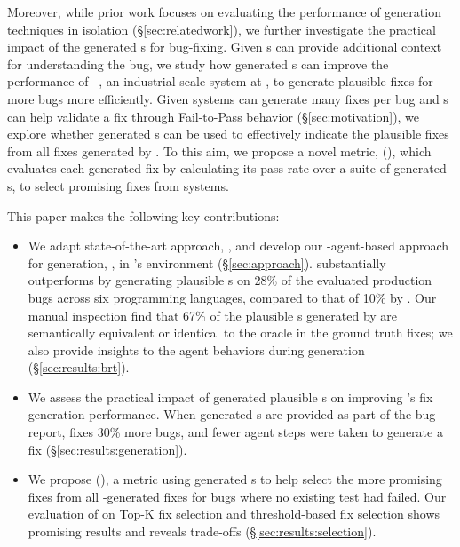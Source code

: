 Moreover, while prior work focuses on evaluating the performance of \brt generation techniques in isolation (\S\ref{sec:relatedwork}), we further investigate the practical impact of the generated \brt{}s for bug-fixing.
Given \brt{}s can provide additional context for understanding the bug, we study how generated \brt{}s can improve the performance of \passerine~\cite{rondon2025passerine}, an industrial-scale \autopr system at \google, to generate plausible fixes for more bugs more efficiently. 
Given \autopr systems can generate many fixes per bug and \brt{}s can help validate a fix through Fail-to-Pass behavior (\S\ref{sec:motivation}), we explore whether generated \brt{}s can be used to effectively indicate the plausible fixes from all fixes generated by \passerine{}. 
To this aim, we propose a novel metric, \enpassratefull (\enpassrate), which evaluates each generated fix by calculating its pass rate over a suite of generated \brt{}s, to select promising fixes from \autopr systems. 

This paper makes the following key contributions:
\begin{itemize}
    \item We adapt state-of-the-art approach, \libro, and develop our \llm-agent-based approach for \brt generation, \tool, in \google's environment (\S\ref{sec:approach}).
    \tool substantially outperforms \libro by generating plausible \brt{}s on 28\% of the evaluated \google production bugs across six programming languages, compared to that of 10\% by \libro.
    Our manual inspection find that 67\% of the plausible \brt{}s generated by \tool are semantically equivalent or identical to the oracle \brt in the ground truth fixes; we also provide insights to the agent behaviors during \brt generation (\S\ref{sec:results:brt}).
    \item We assess the practical impact of generated plausible \brt{}s on improving \passerine's fix generation performance.
    When generated \brt{}s are provided as part of the bug report, \passerine fixes 30\% more bugs, and fewer agent steps were taken to generate a fix (\S\ref{sec:results:generation}).
    \item We propose \enpassratefull (\enpassrate), a metric using generated \brt{}s to help select the more promising fixes from all \autopr-generated fixes for bugs where no existing test had failed. Our evaluation of \enpassrate on Top-K fix selection and threshold-based fix selection shows promising results and reveals trade-offs (\S\ref{sec:results:selection}). 
\end{itemize}




